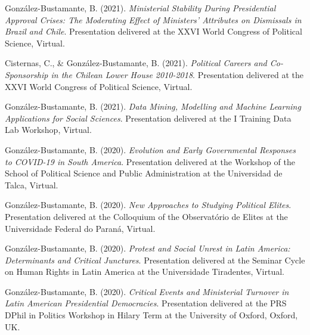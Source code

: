 \begin{publications}
\begin{benumerate}{66}
\item{\small González-Bustamante, B. (2021). {\itshape Ministerial Stability During Presidential Approval Crises: The Moderating Effect of Ministers' Attributes on Dismissals in Brazil and Chile}. Presentation delivered at the XXVI World Congress of Political Science, Virtual.}\vspace{1mm}

\item{\small Cisternas, C., \& González-Bustamante, B. (2021). {\itshape Political Careers and Co-Sponsorship in the Chilean Lower House 2010-2018}. Presentation delivered at the XXVI World Congress of Political Science, Virtual.}\vspace{1mm}

\item{\small González-Bustamante, B. (2021). {\itshape Data Mining, Modelling and Machine Learning Applications for Social Sciences}. Presentation delivered at the I Training Data Lab Workshop, Virtual.}\vspace{1mm}

\item{\small González-Bustamante, B. (2020). {\itshape Evolution and Early Governmental Responses to COVID-19 in South America}. Presentation delivered at the Workshop of the School of Political Science and Public Administration at the Universidad de Talca, Virtual.}\vspace{1mm}

\item{\small González-Bustamante, B. (2020). {\itshape New Approaches to Studying Political Elites}. Presentation delivered at the Colloquium of the Observatório de Elites at the Universidade Federal do Paraná, Virtual.}\vspace{1mm}

\item{\small González-Bustamante, B. (2020). {\itshape Protest and Social Unrest in Latin America: Determinants and Critical Junctures}. Presentation delivered at the Seminar Cycle on Human Rights in Latin America at the Universidade Tiradentes, Virtual.}\vspace{1mm} %

\item{\small González-Bustamante, B. (2020). {\itshape Critical Events and Ministerial Turnover in Latin American Presidential Democracies}. Presentation delivered at the PRS DPhil in Politics Workshop in Hilary Term at the University of Oxford, Oxford, UK.}\vspace{1mm}


\end{benumerate}
\end{publications}
